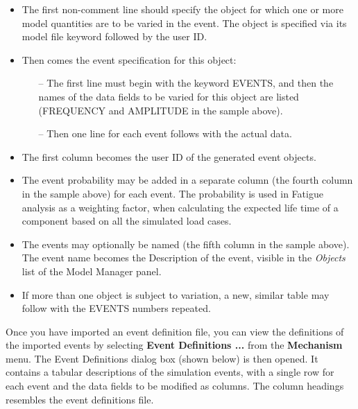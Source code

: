 {\begin{itemize}
\item
  The first non-comment line should specify the object for which one or more
  model quantities are to be varied in the event.
  The object is specified via its model file keyword followed by the user ID.
\item
  Then comes the event specification for this object:
  \begin{itemize}
  \item[--]
    The first line must begin with the keyword EVENTS, and then the names of the
    data fields to be varied for this object are listed (FREQUENCY and AMPLITUDE
    in the sample above).
  \item[--]
    Then one line for each event follows with the actual data.
    \end{itemize}
\item
  The first column becomes the user ID of the generated event objects.
\item
  The event probability may be added in a separate column (the fourth column in
  the sample above) for each event. The probability is used in Fatigue analysis
  as a weighting factor, when calculating the expected life time of a component
  based on all the simulated load cases.
\item
  The events may optionally be named (the fifth column in the sample above).
  The event name becomes the Description of the event, visible in the
  {\sl Objects} list of the Model Manager panel.
\item
  If more than one object is subject to variation, a new, similar table may
  follow with the EVENTS numbers repeated.
\end{itemize}




Once you have imported an event definition file, you can view the definitions of
the imported events by selecting \textbf{Event Definitions ...} from the
\textbf{Mechanism} menu. The Event Definitions dialog box (shown below) is then
opened. It contains a tabular descriptions of the simulation events,
with a single row for each event and the data fields to be modified as columns.
The column headings resembles the event definitions file.

}
